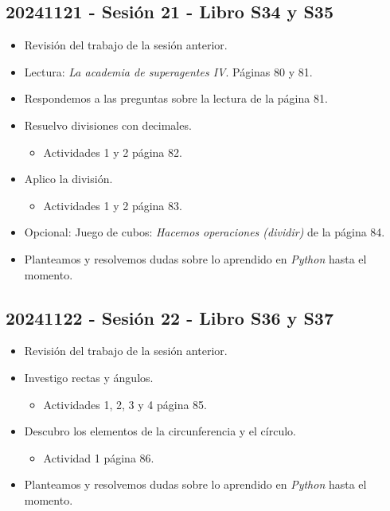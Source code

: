 \documentclass[a4paper,12pt]{article}
\begin{document}
\subsection{20241121 - Sesión 21 - Libro S34 y S35}

\begin{itemize}
    \item Revisión del trabajo de la sesión anterior.
    \item Lectura: \textit{La academia de superagentes IV}. Páginas 80 y 81.
    \item Respondemos a las preguntas sobre la lectura de la página 81.
    \item Resuelvo divisiones con decimales.
    \begin{itemize}
        \item Actividades 1 y 2 página 82.
    \end{itemize}
    \item Aplico la división.
    \begin{itemize}
        \item Actividades 1 y 2 página 83.
    \end{itemize}
    \item Opcional: Juego de cubos: \textit{Hacemos operaciones (dividir)} de la página 84.
    \item Planteamos y resolvemos dudas sobre lo aprendido en \textit{Python} hasta el momento.
\end{itemize}

\subsection{20241122 - Sesión 22 - Libro S36 y S37}

\begin{itemize}
    \item Revisión del trabajo de la sesión anterior.
    \item Investigo rectas y ángulos.
    \begin{itemize}
        \item Actividades 1, 2, 3 y 4 página 85.
    \end{itemize}
    \item Descubro los elementos de la circunferencia y el círculo.
    \begin{itemize}
        \item Actividad 1 página 86.
    \end{itemize}
    \item Planteamos y resolvemos dudas sobre lo aprendido en \textit{Python} hasta el momento.
\end{itemize}
\end{document}
